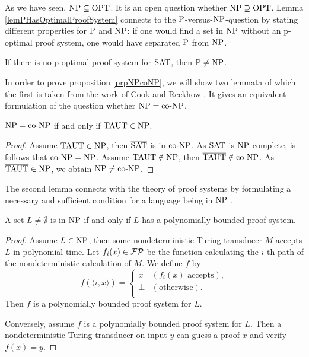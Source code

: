   As we have seen, \(\NP \subseteq \OPT\). It is an open question whether \(\NP \supseteq \OPT\). Lemma \ref{lemPHasOptimalProofSystem} connects to the \(\P\)-versus-\(\NP\)-question by stating different properties for \(\P\) and \(\NP\): if one would find a set in \(\NP\) without an p-optimal proof system, one would have separated \(\P\) from \(\NP\).

  \begin{corollary}
    If there is no p-optimal proof system for \(\SAT\), then \(\P \neq \NP\).
  \end{corollary}  
  
  In order to prove proposition \ref{prpNPcoNP}, we will show two lemmata of which the first is taken from the work of Cook and Reckhow \cite{CR79}. It gives an equivalent formulation of the question whether \(\NP = \coNP\).

  \begin{lemma} \label{lemNPisCoNP}
   \(\NP = \coNP\) if and only if \(\TAUT \in \NP\).
  \end{lemma}
  
  \begin{proof}
    Assume \(\TAUT \in \NP\), then \(\overline{\SAT}\) is in \(\coNP\). As \(\SAT\) is \(\NP\) complete, is follows that \(\coNP = \NP\). Assume \(\TAUT \notin \NP\), then \(\overline{\TAUT} \notin \coNP\). As \(\overline{\TAUT} \in \NP\), we obtain \(\NP \neq \coNP\).
  \end{proof}

  The second lemma connects with the theory of proof systems by formulating a necessary and sufficient condition for a language being in \(\NP\) \cite{CR79}.

  \begin{lemma} \label{lemNPPolyBoundProofSystem}
    A set \(L \neq \emptyset\) is in \(\NP\) if and only if \(L\) has a polynomially bounded proof system.
  \end{lemma}

  \begin{proof}
   Assume \(L \in \NP\), then some nondeterministic Turing transducer \(M\) accepts \(L\) in polynomial time. Let \(f_i(x) \in \FP\) be the function calculating the \(i\)-th path of the nondeterministic calculation of \(M\). We define \(f\) by
   \[
     f(\langle i, x \rangle) =
     \begin{cases}
       x & (f_i(x) \text{ accepts}), \\
       \perp & (\text{otherwise}). \\
     \end{cases}
   \]
   Then \(f\) is a polynomially bounded proof system for \(L\).

   Conversely, assume \(f\) is a polynomially bounded proof system for \(L\). Then a nondeterministic Turing transducer on input \(y\) can guess a proof \(x\) and verify \(f(x) = y\).
  \end{proof}


